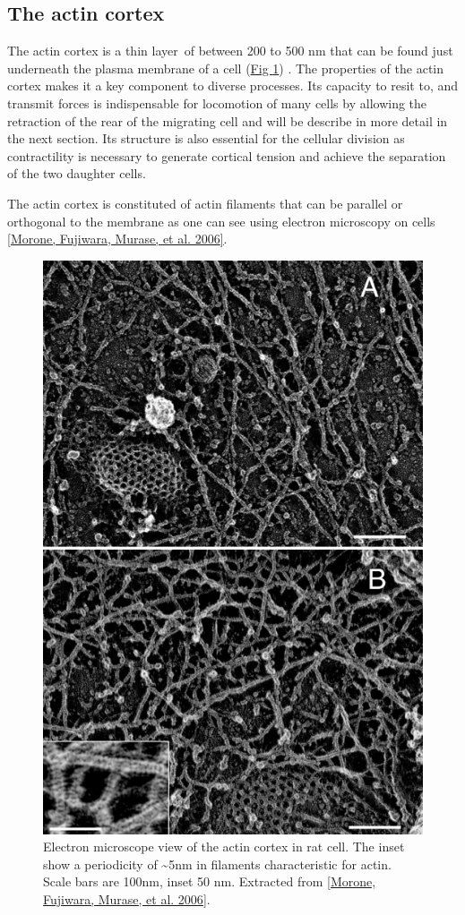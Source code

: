 \documentclass[A4paperpaper,11pt,english]{sphinxmanual}
\begin{document}
\subsection{The actin cortex}
\label{index-latex:the-actin-cortex}
The actin cortex is a thin layer of between 200 to 500 nm that can be found
just underneath the plasma membrane of a cell (\hyperref[index-latex:fig-electro-cortex]{Fig  \ref*{index-latex:fig-electro-cortex}}) . The properties of the actin
cortex makes it a key component to diverse processes.  Its capacity to resit
to, and transmit forces is indispensable for locomotion of many cells by
allowing the retraction of the rear of the migrating cell and will be describe
in more detail in the next section. Its structure is also essential for the
cellular division as contractility is necessary to generate cortical tension
and achieve the separation of the two daughter cells.

The actin cortex is constituted of actin filaments that can be parallel or
orthogonal to the membrane as one can see using electron microscopy on cells
{\hyperref[index-latex:morone2006b]{{[}Morone, Fujiwara, Murase,  et al.  2006{]}}}.
\begin{figure}[htbp]
\centering
\capstart

\includegraphics[width=0.700\linewidth]{Actin-Cortex-Moronne-2006.jpg}
\caption{Electron microscope view of the actin cortex in rat cell. The inset
show a periodicity of \textasciitilde{}5nm in filaments characteristic for actin.  Scale
bars are 100nm, inset 50 nm. Extracted from {\hyperref[index-latex:morone2006b]{{[}Morone, Fujiwara, Murase,  et al.  2006{]}}}.}\label{index-latex:fig-electro-cortex}\end{figure}
\end{document}
